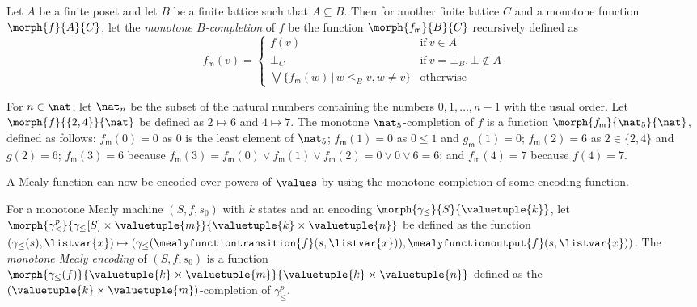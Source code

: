 \begin{definition}\label{def:monotone-completion}
    Let \(A\) be a finite poset and let \(B\) be a finite lattice such that
    \(A \subseteq B\).
    Then for another finite lattice \(C\) and a monotone function
    \(\morph{f}{A}{C}\), let the \emph{monotone \(B\)-completion} of \(f\) be
    the function \(\morph{f_\mathsf{m}}{B}{C}\) recursively defined as \[
        f_\mathsf{m}(v) = \begin{cases}
            f(v)
             &
            \text{if}\ v \in A
            \\
            \bot_C
             &
            \text{if}\ v = \bot_B, \bot \not\in A
            \\
            \bigvee \{ f_\mathsf{m}(w) \,|\, w \leq_B v, w \neq v \}
             &
            \text{otherwise}
        \end{cases}
    \]
\end{definition}

\begin{example}
    For \(n \in \nat\), let \(\nat_{n}\) be the subset of the natural numbers
    containing the numbers \(0,1,\dots,n-1\) with the usual order.
    Let \(\morph{f}{\{2,4\}}{\nat}\) be defined as \(2 \mapsto 6\) and
    \(4 \mapsto 7\).
    The monotone \(\nat_5\)-completion of \(f\) is a function
    \(\morph{f_\mathsf{m}}{\nat_5}{\nat}\), defined as follows:
    \(f_\mathsf{m}(0) = 0\) as \(0\) is the least element of \(\nat_5\);
    \(f_\mathsf{m}(1) = 0\) as \(0 \leq 1\) and \(g_\mathsf{m}(1) = 0\);
    \(f_\mathsf{m}(2) = 6\) as \(2 \in \{2, 4\}\) and \(g(2) = 6\);
    \(f_\mathsf{m}(3) = 6\) because \(
    f_\mathsf{m}(3) =
    f_\mathsf{m}(0) \vee f_\mathsf{m}(1) \vee f_\mathsf{m}(2)
    = 0 \vee 0 \vee 6 = 6
    \); and \(f_\mathsf{m}(4) = 7\) because \(f(4) = 7\).
\end{example}

A Mealy function can now be encoded over powers of \(\values\) by using the
monotone completion of some encoding function.

\begin{definition}\label{def:mealy-encoding}
    For a monotone Mealy machine \((S, f, s_0)\) with \(k\) states and an
    encoding \(\morph{\gamma_\leq}{S}{\valuetuple{k}}\), let
    \(\morph{\gamma^p_\leq}{\gamma_\leq[S] \times \valuetuple{m}}{\valuetuple{k} \times \valuetuple{n}}\)
    be defined as the function \(
    (\gamma_\leq(s), \listvar{x}) \mapsto
    (\gamma_\leq(\mealyfunctiontransition{f}(s, \listvar{x})),
    \mealyfunctionoutput{f}(s, \listvar{x}))
    \).
    The \emph{monotone Mealy encoding} of \((S, f, s_0)\) is a function
    \(
    \morph{
        \gamma_\leq(f)
    }{
        \valuetuple{k} \times \valuetuple{m}
    }{
        \valuetuple{k} \times \valuetuple{n}
    }
    \) defined as the \((\valuetuple{k} \times \valuetuple{m})\)-completion of
    \(\gamma_\leq^p\).
\end{definition}

